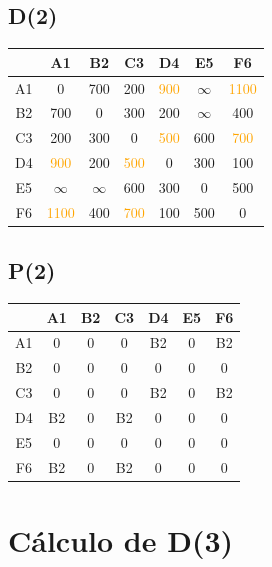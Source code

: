 \documentclass[a4paper,11pt]{article}
\begin{document}
\subsection*{D(2)}
\begin{center}
\begin{tabular}{c|cccccc}
 & A1 & B2 & C3 & D4 & E5 & F6 \\ \hline
A1 & 0 & 700 & 200 & \textcolor{orange}{900} & $\infty$ & \textcolor{orange}{1100} \\
B2 & 700 & 0 & 300 & 200 & $\infty$ & 400 \\
C3 & 200 & 300 & 0 & \textcolor{orange}{500} & 600 & \textcolor{orange}{700} \\
D4 & \textcolor{orange}{900} & 200 & \textcolor{orange}{500} & 0 & 300 & 100 \\
E5 & $\infty$ & $\infty$ & 600 & 300 & 0 & 500 \\
F6 & \textcolor{orange}{1100} & 400 & \textcolor{orange}{700} & 100 & 500 & 0 \\
\end{tabular}
\end{center}
\subsection*{P(2)}
\begin{center}
\begin{tabular}{c|cccccc}
 & A1 & B2 & C3 & D4 & E5 & F6 \\ \hline
A1 & 0 & 0 & 0 & B2 & 0 & B2 \\
B2 & 0 & 0 & 0 & 0 & 0 & 0 \\
C3 & 0 & 0 & 0 & B2 & 0 & B2 \\
D4 & B2 & 0 & B2 & 0 & 0 & 0 \\
E5 & 0 & 0 & 0 & 0 & 0 & 0 \\
F6 & B2 & 0 & B2 & 0 & 0 & 0 \\
\end{tabular}
\end{center}
\newpage
\section*{Cálculo de D(3)}
\end{document}
